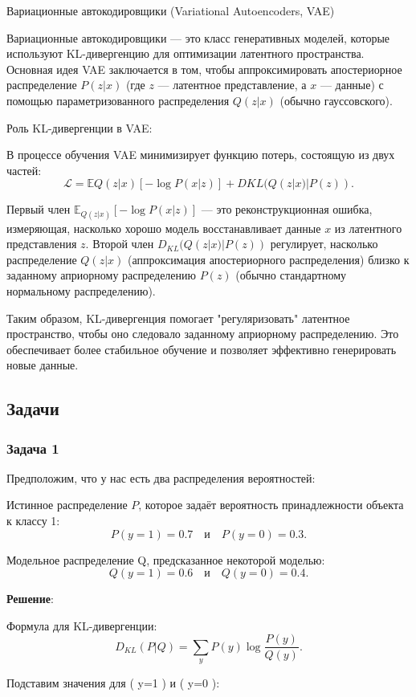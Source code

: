  Вариационные автокодировщики (Variational Autoencoders, VAE)

Вариационные автокодировщики — это класс генеративных моделей, которые используют KL-дивергенцию для оптимизации латентного пространства. Основная идея VAE заключается в том, чтобы аппроксимировать апостериорное распределение $ P(z|x) $ (где $ z $ — латентное представление, а $ x $ — данные) с помощью параметризованного распределения $Q(z|x)$ (обычно гауссовского).

Роль KL-дивергенции в VAE:

В процессе обучения VAE минимизирует функцию потерь, состоящую из двух частей:
\[
\mathcal{L} = \mathbb{E}{Q(z|x)}[-\log P(x|z)] + D{KL}(Q(z|x) | P(z)).
\]

    Первый член $\mathbb{E}_{Q(z|x)}[-\log P(x|z)]$ — это реконструкционная ошибка, измеряющая, насколько хорошо модель восстанавливает данные  $x$ из латентного представления $z$.
    Второй член $D_{KL}(Q(z|x) | P(z))$ регулирует, насколько распределение $Q(z|x)$ (аппроксимация апостериорного распределения) близко к заданному априорному распределению $ P(z) $ (обычно стандартному нормальному распределению).

Таким образом, KL-дивергенция помогает "регуляризовать" латентное пространство, чтобы оно следовало заданному априорному распределению. Это обеспечивает более стабильное обучение и позволяет эффективно генерировать новые данные.

\subsection*{Задачи}
\subsubsection* {Задача 1}
Предположим, что у нас есть два распределения вероятностей:

    Истинное распределение $P$, которое задаёт вероятность принадлежности объекта к классу 1:
    \[
    P(y=1) = 0.7 \quad \text{и} \quad P(y=0) = 0.3.
    \]

    Модельное распределение Q, предсказанное некоторой моделью:
    \[
    Q(y=1) = 0.6 \quad \text{и} \quad Q(y=0) = 0.4.
    \]

\textbf{Решение}:

    Формула для KL-дивергенции:
    \[
    D_{KL}(P | Q) = \sum_{y} P(y) \log \frac{P(y)}{Q(y)}.
    \]

Подставим значения для ( y=1 ) и ( y=0 ):

